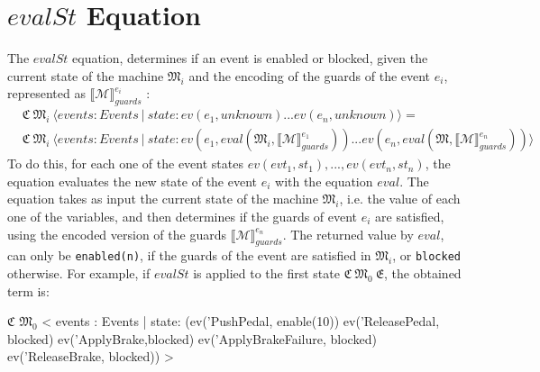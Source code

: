 \section{$evalSt$ Equation}
The $evalSt$ equation, determines if an event is enabled or blocked, given the current state of the machine $\mathfrak{M}_i$ and the encoding of the guards of the event $e_i$, represented as $\llbracket \mathscr{M} \rrbracket^{e_i}_{guards}$ :
\begin{align*}
    &\mathfrak{C} \ \mathfrak{M}_{i} \ \langle events : Events \ | \ state: ev(e_1,unknown) ... ev(e_n, unknown) \rangle = \\
    &\mathfrak{C} \ \mathfrak{M}_{i} \ \langle events : Events \ | \ state: ev(e_1, eval(\mathfrak{M}_i, \llbracket \mathscr{M} \rrbracket^{e_1}_{guards})) ... ev(e_n, eval(\mathfrak{M}, \llbracket \mathscr{M} \rrbracket^{e_n}_{guards})) \rangle
\end{align*}
To do this, for each one of the event states $ev(evt_1,st_1), ..., ev(evt_n,st_n)$, the equation evaluates the new state of the event $e_i$ with the equation $eval$. The equation takes as input the current state of the machine $\mathfrak{M}_i$, i.e. the value of each one of the variables, and then determines if the guards of event $e_i$ are satisfied, using the encoded version of the guards  $\llbracket \mathscr{M} \rrbracket^{e_n}_{guards}$. The returned value by $eval$, can only be \texttt{enabled(n)}, if the guards of the event are satisfied in $\mathfrak{M}_i$, or \texttt{blocked} otherwise. For example, if $evalSt$ is applied to the first state $\mathfrak{C} \ \mathfrak{M}_{0}  \ \mathfrak{E}$, the obtained term is:
\begin{maude}

$\mathfrak{C}$ $\mathfrak{M}_0$ < events : Events | state: (ev('PushPedal, enable(10)) 
                                 ev('ReleasePedal, blocked) 
                                 ev('ApplyBrake,blocked) 
                                 ev('ApplyBrakeFailure, blocked)
                                 ev('ReleaseBrake, blocked)) >
\end{maude}



